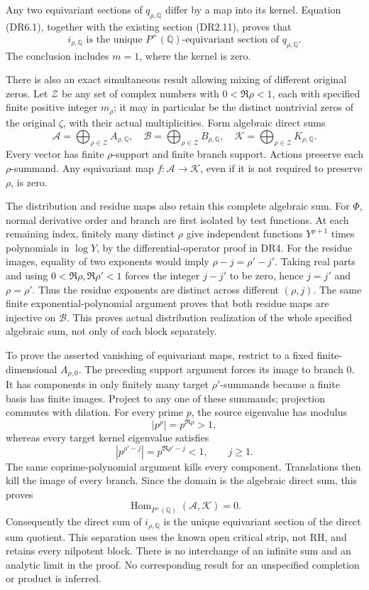 Any two equivariant sections of \(q_{\rho,\mathbb Q}\) differ by a map
into its kernel. Equation (DR6.1), together with the existing section
(DR2.11), proves that \[
 \boxed{i_{\rho,\mathbb Q}
       \text{ is the unique }P^+(\mathbb Q)\text{-equivariant
       section of }q_{\rho,\mathbb Q}.}
\tag{DR6.3}
\] The conclusion includes \(m=1\), where the kernel is zero.

There is also an exact simultaneous result allowing mixing of different
original zeros. Let \(\mathscr Z\) be any set of complex numbers with
\(0<\Re\rho<1\), each with specified finite positive integer \(m_\rho\);
it may in particular be the distinct nontrivial zeros of the original
\(\zeta\), with their actual multiplicities. Form algebraic direct sums
\[
 \mathscr A=\bigoplus_{\rho\in\mathscr Z}
       A_{\rho,\mathbb Q},\quad
 \mathscr B=\bigoplus_{\rho\in\mathscr Z}
       B_{\rho,\mathbb Q},\quad
 \mathscr K=\bigoplus_{\rho\in\mathscr Z}
       K_{\rho,\mathbb Q}.
\tag{DR6.4}
\] Every vector has finite \(\rho\)-support and finite branch support.
Actions preserve each \(\rho\)-summand. Any equivariant map
\(f:\mathscr A\to\mathscr K\), even if it is not required to preserve
\(\rho\), is zero.

The distribution and residue maps also retain this complete algebraic
sum. For \(\Phi\), normal derivative order and branch are first isolated
by test functions. At each remaining index, finitely many distinct
\(\rho\) give independent functions \(Y^{\rho+1}\) times polynomials in
\(\log Y\), by the differential-operator proof in DR4. For the residue
images, equality of two exponents would imply \(\rho-j=\rho'-j'\).
Taking real parts and using \(0<\Re\rho,\Re\rho'<1\) forces the integer
\(j-j'\) to be zero, hence \(j=j'\) and \(\rho=\rho'\). Thus the residue
exponents are distinct across different \((\rho,j)\). The same finite
exponential-polynomial argument proves that both residue maps are
injective on \(\mathscr B\). This proves actual distribution realization
of the whole specified algebraic sum, not only of each block separately.

To prove the asserted vanishing of equivariant maps, restrict to a fixed
finite-dimensional \(A_{\rho,0}\). The preceding support argument forces
its image to branch \(0\). It has components in only finitely many
target \(\rho'\)-summands because a finite basis has finite images.
Project to any one of these summands; projection commutes with dilation.
For every prime \(p\), the source eigenvalue has modulus \[
 |p^\rho|=p^{\Re\rho}>1,
\] whereas every target kernel eigenvalue satisfies \[
 |p^{\rho'-j}|=p^{\Re\rho'-j}<1,\qquad j\ge1.
\tag{DR6.5}
\] The same coprime-polynomial argument kills every component.
Translations then kill the image of every branch. Since the domain is
the algebraic direct sum, this proves \[
 \boxed{\operatorname{Hom}_{P^+(\mathbb Q)}
               (\mathscr A,\mathscr K)=0.}
\tag{DR6.6}
\] Consequently the direct sum of \(i_{\rho,\mathbb Q}\) is the unique
equivariant section of the direct sum quotient. This separation uses the
known open critical strip, not RH, and retains every nilpotent block.
There is no interchange of an infinite sum and an analytic limit in the
proof. No corresponding result for an unspecified completion or product
is inferred.


